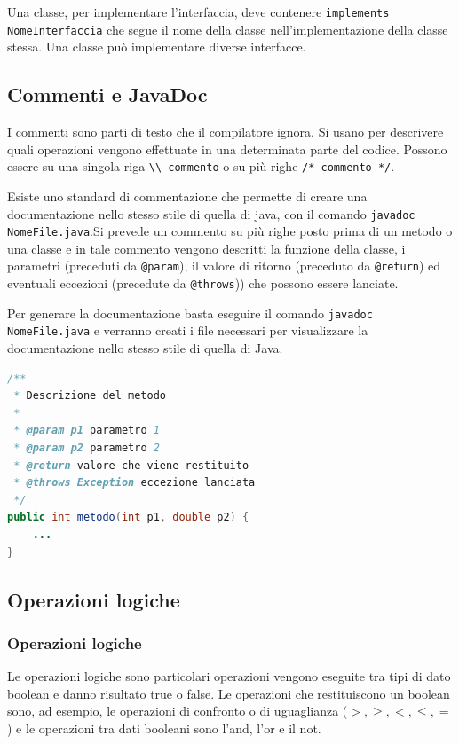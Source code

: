 \documentclass{article}
\begin{document}
Una classe, per implementare l'interfaccia, deve contenere \verb|implements NomeInterfaccia| che segue il nome della
classe nell'implementazione della classe stessa. Una classe può implementare diverse interfacce.

\subsection{Commenti e JavaDoc}
I commenti sono parti di testo che il compilatore ignora. Si usano per descrivere quali operazioni vengono effettuate
in una determinata parte del codice. Possono essere su una singola riga \verb|\\ commento| o su più righe \verb|/* commento */|.

Esiste uno standard di commentazione che permette di creare una documentazione nello stesso stile di quella di java,
con il  comando \verb|javadoc NomeFile.java|.Si prevede un commento su più righe posto prima di un metodo o una classe
e in tale commento vengono descritti la funzione della classe, i parametri (preceduti da \verb|@param|), il valore di
ritorno (preceduto da \verb|@return|) ed eventuali eccezioni (precedute da \verb|@throws|)) che possono essere lanciate.

Per generare la documentazione basta eseguire il comando \verb|javadoc NomeFile.java| e verranno creati i file necessari
per visualizzare la documentazione nello stesso stile di quella di Java.

\begin{lstlisting}[language=Java]
/**
 * Descrizione del metodo
 * 
 * @param p1 parametro 1
 * @param p2 parametro 2
 * @return valore che viene restituito
 * @throws Exception eccezione lanciata
 */
public int metodo(int p1, double p2) {
	...
}
\end{lstlisting}

\newpage


\subsection{Operazioni logiche}
\subsubsection*{Operazioni logiche}
Le operazioni logiche sono particolari operazioni vengono eseguite tra tipi di dato boolean e danno risultato true o false.
Le operazioni che restituiscono un boolean sono, ad esempio, le operazioni di confronto o di uguaglianza (\(>, \geq, <, \leq, =\))
e le operazioni tra dati booleani sono l'and, l'or e il not.
\end{document}
